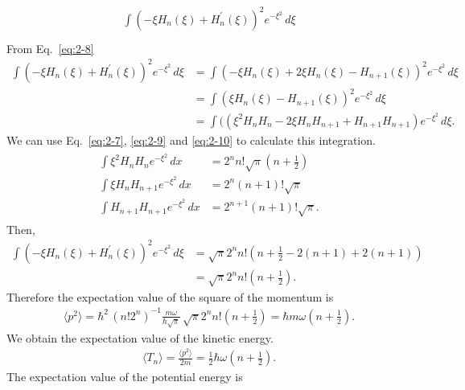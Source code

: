 \documentclass[floatfix,nofootinbib,superscriptaddress,fleqn]{revtex4-2}
\begin{document}
\begin{itemize}
\begin{align}
\begin{split}
      \int(-\xi H_n\left(\xi\right) 
      +H^\prime_n\left(\xi\right))^2 e^{-\xi^2}\,d\xi  \\
    \end{split}
  \end{align}
  From Eq.~\eqref{eq:2-8}
  \begin{align}
      \int(-\xi H_n\left(\xi\right) 
      +H^\prime_n\left(\xi\right))^2 e^{-\xi^2}\,d\xi
      &=\int(-\xi H_n\left(\xi\right) 
      + 2\xi H_n(\xi)-H_{n+1}(\xi))^2 e^{-\xi^2}\,d\xi  \\
      &=\int(\xi H_n\left(\xi\right) 
      -H_{n+1}(\xi))^2 e^{-\xi^2}\,d\xi \\
      &=\int(
      (\xi^2H_nH_n-2\xi H_nH_{n+1}+H_{n+1}H_{n+1})  
      e^{-\xi^2}\,d\xi.
  \end{align}
  We can use Eq.~\eqref{eq:2-7}, \eqref{eq:2-9} and 
  \eqref{eq:2-10} to calculate this integration.
  \begin{align}
    \begin{split}
      \int \xi^2 H_n H_n e^{-\xi^2}\,dx 
      &= 2^nn!\sqrt{\pi}\left( n+\frac{1}{2} \right) \\  
      \int \xi H_n H_{n+1} e^{-\xi^2}\,dx 
      &= 2^n(n+1)!\sqrt{\pi}\\  
      \int  H_{n+1} H_{n+1} e^{-\xi^2}\,dx 
      &= 2^{n+1}(n+1)!\sqrt{\pi}.
    \end{split}
  \end{align}
  Then,
  \begin{align}
      \int(-\xi H_n\left(\xi\right) 
      +H^\prime_n\left(\xi\right))^2 e^{-\xi^2}\,d\xi
      &= \sqrt{\pi}2^nn!
      \left(n+\frac{1}{2}-2(n+1)+2(n+1) \right) \\
      &= \sqrt{\pi}2^nn!\left( n+\frac{1}{2} \right).
  \end{align}
  Therefore the expectation value of the square of the momentum is
  \begin{align}\label{eq:3-ps}
    \langle p^2\rangle = \hbar^2\,(n!2^n)^{-1}\frac{m\omega}
    {\hbar\sqrt{\pi}}\,
    \sqrt{\pi}2^nn!\left( n+\frac{1}{2} \right)
    =\hbar m\omega\left( n+\frac{1}{2} \right).
  \end{align}
  We obtain the expectation value of the kinetic energy.
  \begin{align}\label{eq:3-3}
    \langle T_n\rangle=\frac{\langle p^2\rangle}{2m}
    =\frac{1}{2}\hbar \omega\left( n+\frac{1}{2} \right).
  \end{align}
  The expectation value of the potential energy is
  \begin{align}

\end{align}
\end{itemize}
\end{document}
